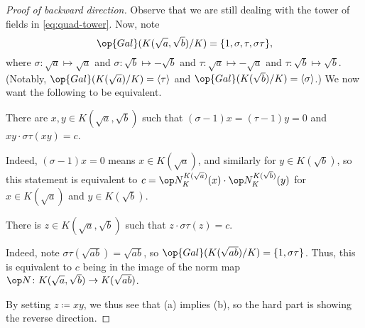 \documentclass[../notes.tex]{subfiles}
\begin{document}
\begin{proof}[Proof of backward direction]
	Observe that we are still dealing with the tower of fields in \eqref{eq:quad-tower}. Now, note
	\[\op{Gal}(K(\sqrt a,\sqrt b)/K)=\{1,\sigma,\tau,\sigma\tau\},\]
	where $\sigma\colon\sqrt a\mapsto\sqrt a$ and $\sigma\colon\sqrt b\mapsto-\sqrt b$ and $\tau\colon\sqrt a\mapsto-\sqrt a$ and $\tau\colon\sqrt b\mapsto\sqrt b$. (Notably, $\op{Gal}(K(\sqrt a)/K)=\langle\tau\rangle$ and $\op{Gal}(K(\sqrt b)/K)=\langle\sigma\rangle$.) We now want the following to be equivalent.
	\begin{listalph}
		\item There are $x,y\in K(\sqrt a,\sqrt b)$ such that $(\sigma-1)x=(\tau-1)y=0$ and $xy\cdot\sigma\tau(xy)=c$.

		Indeed, $(\sigma-1)x=0$ means $x\in K(\sqrt a)$, and similarly for $y\in K(\sqrt b)$, so this statement is equivalent to $c=\op N^{K(\sqrt a)}_K(x)\cdot\op N^{K(\sqrt b)}_K(y)$ for $x\in K(\sqrt a)$ and $y\in K(\sqrt b)$.

		\item There is $z\in K(\sqrt a,\sqrt b)$ such that $z\cdot\sigma\tau(z)=c$.

		Indeed, note $\sigma\tau(\sqrt{ab})=\sqrt{ab}$, so $\op{Gal}(K(\sqrt{ab})/K)=\{1,\sigma\tau\}$. Thus, this is equivalent to $c$ being in the image of the norm map ${\op N}\colon K(\sqrt a,\sqrt b)\to K(\sqrt{ab})$.
	\end{listalph}
	By setting $z\coloneqq xy$, we thus see that (a) implies (b), so the hard part is showing the reverse direction.


\end{proof}
\end{document}
